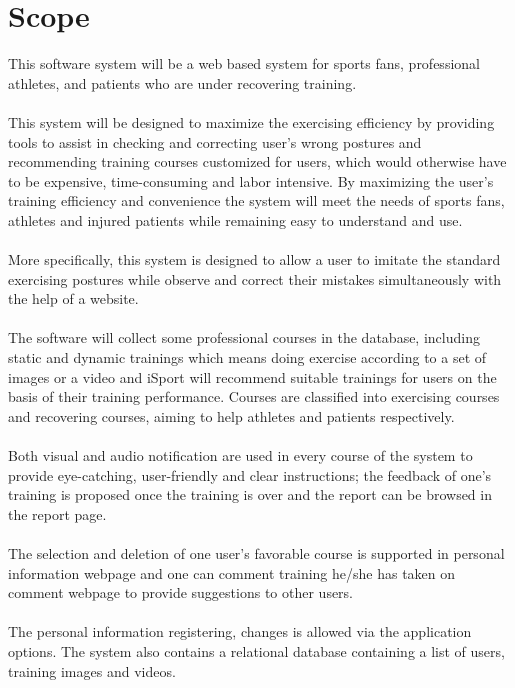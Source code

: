 \documentclass[16pt]{scrreprt}
\begin{document}
\section{Scope}
This software system will be a web based system for sports fans, professional athletes, and patients who are under recovering training. \\
\\
This system will be designed to maximize the exercising efficiency by providing tools to assist in checking and correcting user's wrong postures and recommending training courses customized for users, which would otherwise have to be expensive, time-consuming and labor intensive. By maximizing the user’s training efficiency and convenience the system will meet the needs of sports fans, athletes and injured patients while remaining easy to understand and use.\\
\\
More specifically, this system is designed to allow a user to imitate the standard exercising postures while observe and correct their mistakes simultaneously with the help of a website. \\
\\
The software will collect some professional courses in the database, including static and dynamic trainings which means doing exercise according to a set of images or a video and iSport will recommend suitable trainings for users on the basis of their training performance. Courses are classified into exercising courses and recovering courses, aiming to help athletes and patients respectively.\\
\\
Both visual and audio notification are used in every course of the system to provide eye-catching, user-friendly and clear instructions; the feedback of one's training is proposed once the training is over and the report can be browsed in the report page.\\
\\
The selection and deletion of one user's favorable course is supported in personal information webpage and one can comment training he/she has taken on comment webpage to provide suggestions to other users.\\
\\
 The personal information registering, changes is allowed via the application options. The system also contains a relational database containing a list of users, training images and videos.
\end{document}
